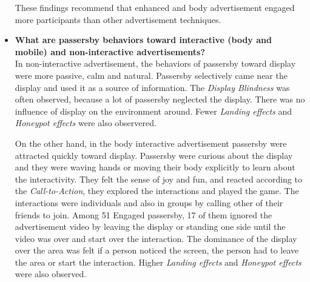 \begin{itemize}
These findings recommend that enhanced and body advertisement engaged more participants than other advertisement techniques.



\begin{table}[H]
\caption{Week sequence}
\label{tab:advertisementWeeks}
\centering
{}
\end{table}







\item \textbf{What are passersby behaviors toward interactive (body and mobile) and non-interactive advertisements?} \\
In non-interactive advertisement, the behaviors of passersby toward display were more passive, calm and natural. Passersby selectively came near the display and used it as a source of information. The \emph{Display Blindness} was often observed, because a lot of passersby neglected the display. There was no influence of display on the environment around. Fewer \emph{Landing effects} and \emph{Honeypot effects} were also observered.

On the other hand, in the body interactive advertisement passersby were attracted quickly toward display. Passersby were curious about the display and they were waving hands or moving their body explicitly to learn about the interactivity. They felt the sense of joy and fun, and reacted according to the \emph{Call-to-Action}, they explored the interactions and played the game. The interactions were individuals and also in groups by calling other of their friends to join. Among 51 Engaged passersby, 17 of them ignored the advertisement video by leaving the display or standing one side until the video was over and start over the interaction. The dominance of the display over the area was felt if a person noticed the screen, the person had to leave the area or start the interaction. Higher \emph{Landing effects} and \emph{Honeypot effects} were also observed.


\end{itemize}
